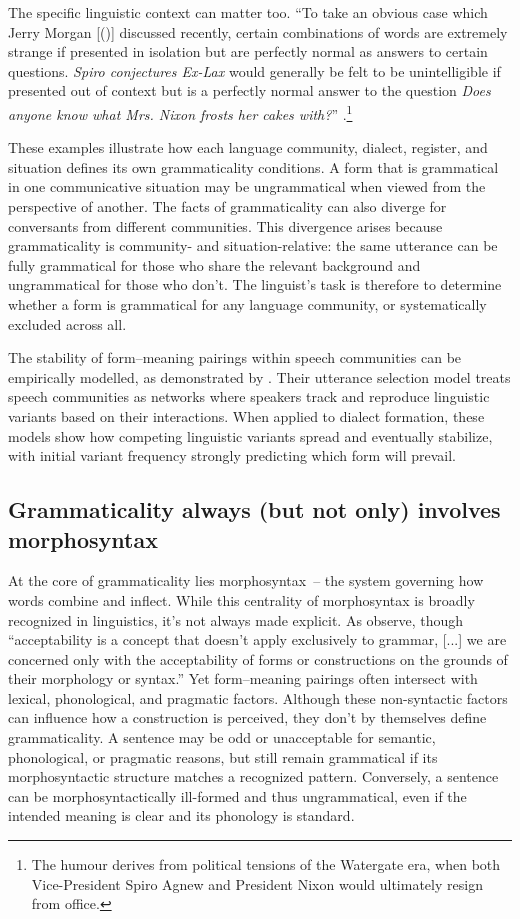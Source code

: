 \documentclass[12pt,letterpaper]{article}
\begin{document}
The specific linguistic context can matter too. ``To take an obvious case which Jerry Morgan [(\citeyear{morgan1973})] discussed recently, certain combinations of words are extremely strange if presented in isolation but are perfectly normal as answers to
certain questions. \textit{Spiro conjectures Ex-Lax} would generally be felt to be unintelligible if presented out of context but is a perfectly normal answer to the question
\textit{Does anyone know what Mrs. Nixon frosts her cakes with?}'' \autocite[252, italics added]{McCawley1974}.\footnote{The humour derives from political tensions of the Watergate era, when both Vice-President Spiro Agnew and President Nixon would ultimately resign from office.}

These examples illustrate how each language community, dialect, register, and situation defines its own grammaticality conditions. A form that is grammatical in one communicative situation may be ungrammatical when viewed from the perspective of another. The facts of grammaticality can also diverge for conversants from different communities. This divergence arises because grammaticality is community- and situation-relative: the same utterance can be fully grammatical for those who share the relevant background and ungrammatical for those who don't. The linguist’s task is therefore to determine whether a form is grammatical for any language community, or systematically excluded across all.

The stability of form--meaning pairings within speech communities can be empirically modelled, as demonstrated by \textcite{blythe2009speech}. Their utterance selection model treats speech communities as networks where speakers track and reproduce linguistic variants based on their interactions. When applied to dialect formation, these models show how competing linguistic variants spread and eventually stabilize, with initial variant frequency strongly predicting which form will prevail.

\subsection{Grammaticality always (but not only) involves morphosyntax} \label{sec:involves-morphosyntax}

At the core of grammaticality lies morphosyntax~-- the system governing how words combine and inflect. While this centrality of morphosyntax is broadly recognized in linguistics, it's not always made explicit. As \textcite[33]{Quirk1972} observe, though \enquote{acceptability is a concept that doesn't apply exclusively to grammar, [...] we are concerned only with the acceptability of forms or constructions on the grounds of their morphology or syntax.} Yet form--meaning pairings often intersect with lexical, phonological, and pragmatic factors. Although these non-syntactic factors can influence how a construction is perceived, they don't by themselves define grammaticality. A sentence may be odd or unacceptable for semantic, phonological, or pragmatic reasons, but still remain grammatical if its morphosyntactic structure matches a recognized pattern. Conversely, a sentence can be morphosyntactically ill-formed and thus ungrammatical, even if the intended meaning is clear and its phonology is standard.
\end{document}
